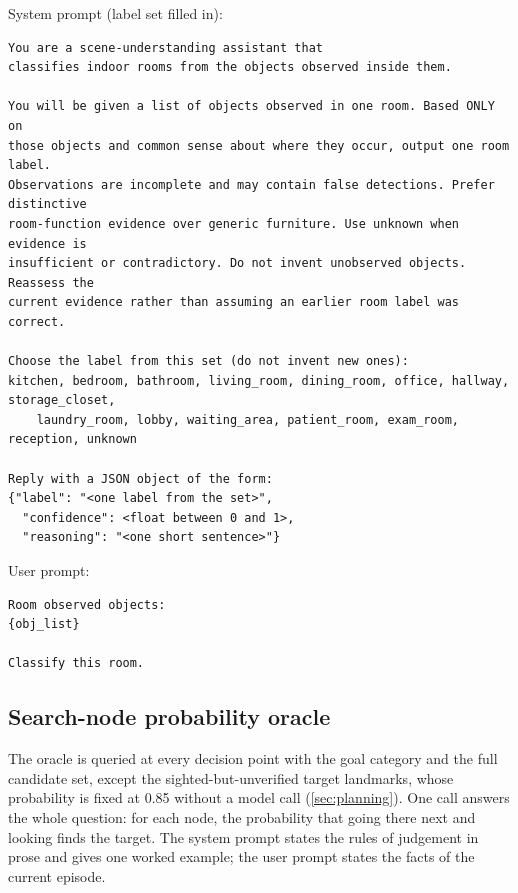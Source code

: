 \documentclass[10pt]{article}
\begin{document}
\noindent System prompt (label set filled in):
\begin{small}
\begin{verbatim}
You are a scene-understanding assistant that
classifies indoor rooms from the objects observed inside them.

You will be given a list of objects observed in one room. Based ONLY on
those objects and common sense about where they occur, output one room label.
Observations are incomplete and may contain false detections. Prefer distinctive
room-function evidence over generic furniture. Use unknown when evidence is
insufficient or contradictory. Do not invent unobserved objects. Reassess the
current evidence rather than assuming an earlier room label was correct.

Choose the label from this set (do not invent new ones):
kitchen, bedroom, bathroom, living_room, dining_room, office, hallway, storage_closet,
    laundry_room, lobby, waiting_area, patient_room, exam_room, reception, unknown

Reply with a JSON object of the form:
{"label": "<one label from the set>",
  "confidence": <float between 0 and 1>,
  "reasoning": "<one short sentence>"}
\end{verbatim}
\end{small}

\noindent User prompt:
\begin{small}
\begin{verbatim}
Room observed objects:
{obj_list}

Classify this room.
\end{verbatim}
\end{small}

\subsection{Search-node probability oracle}\label{app:prompts-oracle}

The oracle is queried at every decision point with the goal category and the full candidate set, except the sighted-but-unverified target landmarks, whose probability is fixed at 0.85 without a model call (\cref{sec:planning}). One call answers the whole question: for each node, the probability that going there next and looking finds the target. The system prompt states the rules of judgement in prose and gives one worked example; the user prompt states the facts of the current episode.
\end{document}
